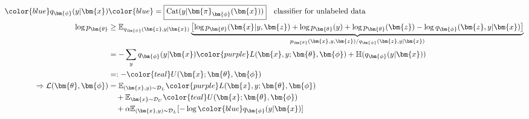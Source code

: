 \begin{align}
    {\color{blue}q_{\bm{\phi}}(y|\bm{x})}
    &{\color{blue}=\boxed{\mathrm{Cat}(y|\bm{\pi}_{\bm{\phi}}(\bm{x}))} }~~~\text{classifier for unlabeled data}\\
    \log p_{\bm{\theta}}
    &\geq \mathbb{E}_{q_{\bm{\phi}}(\bm{z},y|\bm{x})}\underbrace{\left[
        \log p_{\bm{\theta}}(\bm{x}|y,\bm{z}) + \log p_{\bm{\theta}}(y) + \log p_{\bm{\theta}}(\bm{z}) - \log q_{\bm{\phi}}(\bm{z},y|\bm{x})
    \right]}_{p_{\bm{\theta}}(\bm{x},y,\bm{z})/q_{\bm{\phi}}(\bm{z},y|\bm{x})} \\
    &= -\sum_{y} q_{\bm{\phi}}(y|\bm{x}){\color{purple}L(\bm{x},y;\bm{\theta},\bm{\phi})} + \mathbb{H}(q_{\bm{\phi}}(y|\bm{x})) \\
    &=: -{\color{teal}U(\bm{x};\bm{\theta},\bm{\phi})}\\
    \Rightarrow \mathcal{L}(\bm{\theta},\bm{\phi}) 
    &= \mathbb{E}_{(\bm{x},y)\sim\mathcal{D}_L}{\color{purple}L(\bm{x},y;\bm{\theta},\bm{\phi})}\\
    &~~~+ \mathbb{E}_{\bm{x}\sim\mathcal{D}_U}{\color{teal}U(\bm{x};\bm{\theta},\bm{\phi})} \\
    &~~~+\alpha \mathbb{E}_{(\bm{x},y)\sim\mathcal{D}_L}[-\log {\color{blue}q_{\bm{\phi}}(y|\bm{x})}]
\end{align}



